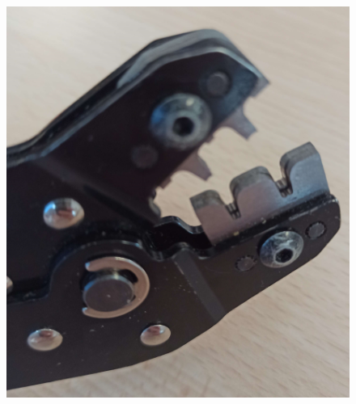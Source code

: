 \documentclass{article}
\begin{document}
\begin{figure}[h]
    \begin{minipage}{0.45\textwidth}
        \centering
        \includegraphics[width=\linewidth]{images/pince_sertir_emplacement_cosse_JST.jpg}
        \captionsetup{labelformat=empty}
        \caption{}
        \label{fig:image1}
    \end{minipage}
    \hfill
    \begin{minipage}{0.45\textwidth}
        \centering

\end{minipage}
\end{figure}
\end{document}
